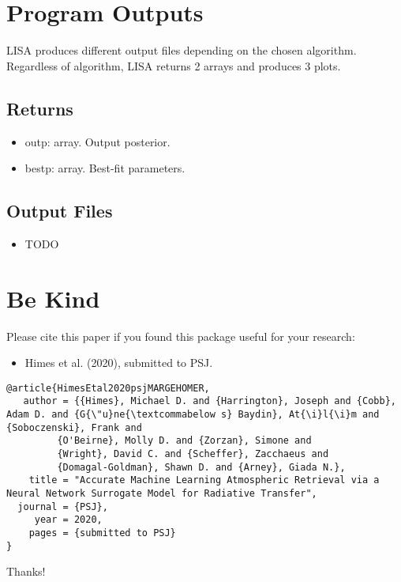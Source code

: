 \documentclass[letterpaper, 12pt]{article}
\begin{document}
\section{Program Outputs}
\label{sec:outputs}

LISA produces different output files depending on the chosen algorithm.
Regardless of algorithm, LISA returns 2 arrays and produces 3 plots.

\subsection{Returns}
\begin{itemize}
\item outp: array. Output posterior.
\item bestp: array. Best-fit parameters.
\end{itemize}

\subsection{Output Files}
\begin{itemize}
\item TODO
\end{itemize}


\section{Be Kind}
\label{sec:bekind}
Please cite this paper if you found this package useful for your
research:

\begin{itemize}
\item Himes et al. (2020), submitted to PSJ.
\end{itemize}

\begin{verbatim}
@article{HimesEtal2020psjMARGEHOMER,
   author = {{Himes}, Michael D. and {Harrington}, Joseph and {Cobb}, Adam D. and {G{\"u}ne{\textcommabelow s} Baydin}, At{\i}l{\i}m and {Soboczenski}, Frank and
         {O'Beirne}, Molly D. and {Zorzan}, Simone and
         {Wright}, David C. and {Scheffer}, Zacchaeus and
         {Domagal-Goldman}, Shawn D. and {Arney}, Giada N.},
    title = "Accurate Machine Learning Atmospheric Retrieval via a Neural Network Surrogate Model for Radiative Transfer",
  journal = {PSJ},
     year = 2020,
    pages = {submitted to PSJ}
}
\end{verbatim}

\noindent Thanks!


\end{document}
